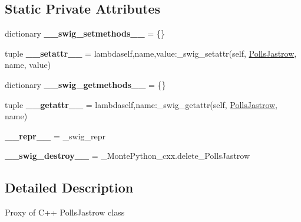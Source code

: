 \subsection*{Static Private Attributes}
\begin{DoxyCompactItemize}
\item 
\hypertarget{classMontePython__cxx_1_1PollsJastrow_a3edb97120f09a813d26e90a9f741dffb}{}dictionary {\bfseries \+\_\+\+\_\+swig\+\_\+setmethods\+\_\+\+\_\+} = \{\}\label{classMontePython__cxx_1_1PollsJastrow_a3edb97120f09a813d26e90a9f741dffb}

\item 
\hypertarget{classMontePython__cxx_1_1PollsJastrow_af1d41c06e2496237bee67b7fab3a081c}{}tuple {\bfseries \+\_\+\+\_\+setattr\+\_\+\+\_\+} = lambdaself,name,value\+:\+\_\+swig\+\_\+setattr(self, \hyperlink{classMontePython__cxx_1_1PollsJastrow}{Polls\+Jastrow}, name, value)\label{classMontePython__cxx_1_1PollsJastrow_af1d41c06e2496237bee67b7fab3a081c}

\item 
\hypertarget{classMontePython__cxx_1_1PollsJastrow_affa9c0d0cdfe9f9a56023e4b9f15d155}{}dictionary {\bfseries \+\_\+\+\_\+swig\+\_\+getmethods\+\_\+\+\_\+} = \{\}\label{classMontePython__cxx_1_1PollsJastrow_affa9c0d0cdfe9f9a56023e4b9f15d155}

\item 
\hypertarget{classMontePython__cxx_1_1PollsJastrow_a4edda4060ac7f855b98a832881c0af92}{}tuple {\bfseries \+\_\+\+\_\+getattr\+\_\+\+\_\+} = lambdaself,name\+:\+\_\+swig\+\_\+getattr(self, \hyperlink{classMontePython__cxx_1_1PollsJastrow}{Polls\+Jastrow}, name)\label{classMontePython__cxx_1_1PollsJastrow_a4edda4060ac7f855b98a832881c0af92}

\item 
\hypertarget{classMontePython__cxx_1_1PollsJastrow_a80006c1bd92405a2d460f89521c02ad2}{}{\bfseries \+\_\+\+\_\+repr\+\_\+\+\_\+} = \+\_\+swig\+\_\+repr\label{classMontePython__cxx_1_1PollsJastrow_a80006c1bd92405a2d460f89521c02ad2}

\item 
\hypertarget{classMontePython__cxx_1_1PollsJastrow_a2e7f7671ad4d5675444da365c450345e}{}{\bfseries \+\_\+\+\_\+swig\+\_\+destroy\+\_\+\+\_\+} = \+\_\+\+Monte\+Python\+\_\+cxx.\+delete\+\_\+\+Polls\+Jastrow\label{classMontePython__cxx_1_1PollsJastrow_a2e7f7671ad4d5675444da365c450345e}

\end{DoxyCompactItemize}


\subsection{Detailed Description}
\begin{DoxyVerb}Proxy of C++ PollsJastrow class\end{DoxyVerb}
 

